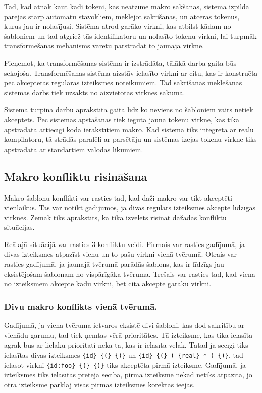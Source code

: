 
Tad, kad atnāk kaut kādi tokeni, kas neatzīmē makro sākšanās, sistēma izpilda pārejas starp automātu stāvokļiem, meklējot sakrišanas, un atceras tokenus, kurus jau ir nolasījusi. Sistēma atrod garāko virkni, kas atbilst kādam no šabloniem un tad atgriež tās identifikatoru un nolasīto tokenu virkni, lai turpmāk transformēšanas mehānisms varētu pārstrādāt to jaunajā virknē.

Pieņemot, ka transformēšanas sistēma ir izstrādāta, tālākā darba gaita būs sekojoša. Transformēšanas sistēma aizstāv ielasīto virkni ar citu, kas ir konstruēta pēc akceptētās regulārās izteiksmes noteikumiem. Tad sakrišanas meklēšanas sistēmas darbs tiek uzsākts no aizvietotās virknes sākuma.

Sistēma turpina darbu aprakstītā gaitā līdz ko neviens no šabloniem vairs netiek akceptēts. Pēc sistēmas apstāšanās tiek iegūta jauna tokenu virkne, kas tika apstrādāta attiecīgi kodā ierakstītiem makro. Kad sistēma tiks integrēta ar reālu kompilatoru, tā strādās paralēli ar parsētāju un sistēmas izejas tokenu virkne tiks apstrādāta ar standartiem valodas likumiem.

\subsection{\label{solution_conflictresolving}Makro konfliktu risināšana}
Makro šablonu konflikti var rasties tad, kad daži makro var tikt akceptēti vienlaikus. Tas var notikt gadījumos, ja divas regulārs izteiksmes akceptē līdzīgas virknes. Zemāk tiks aprakstīts, kā tika izvēlēts risināt dažādas konfliktu situācijas. 

Reālajā situācijā var rasties 3 konfliktu veidi. Pirmais var rasties gadījumā, ja divas izteiksmes atpazīst vienu un to pašu virkni vienā tvērumā. Otrais var rasties gadījumā, ja jaunajā tvērumā parādās šablons, kas ir līdzīgs jau eksistējošam šablonam no vispārīgāka tvēruma. Trešais var rasties tad, kad viena no izteiksmēm akceptē kādu virkni, bet cita akceptē garāku virkni.

\subsubsection{Divu makro konflikts vienā tvērumā.}

Gadījumā, ja viena tvēruma ietvaros eksistē divi šabloni, kas dod sakritību ar vienādu garumu, tad tiek ņemtas vērā prioritātes. Tā izteiksme, kas tika ielasīta agrāk būs ar lielāku prioritāti nekā tā, kas ir ielasīta vēlāk. Tātad ja secīgi tiks ielasītas divas izteiksmes \verb|{id} {(} {)}| un \verb|{id} {(} ( {real} * ) {)}|, tad ielasot virkni \verb|{id:foo} {(} {)}| tiks akceptēta pirmā izteiksme. Gadījumā, ja izteiksmes tiks ielasītas pretējā secībā, pirmā izteiksme nekad netiks atpazīta, jo otrā izteiksme pārklāj visas pirmās izteiksmes korektās ieejas.

